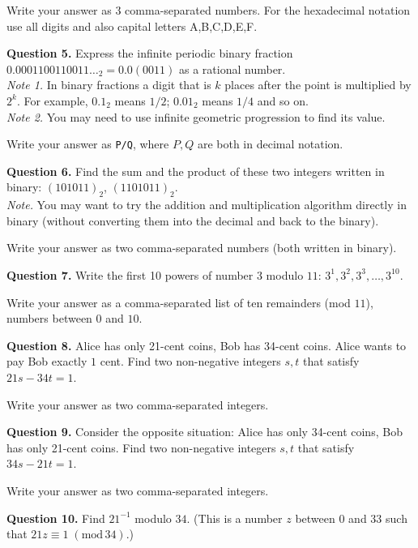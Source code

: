 \documentclass[jou]{apa6}
\begin{document}
Write your answer as $3$ comma-separated numbers. For the hexadecimal notation use all digits and also capital letters A,B,C,D,E,F.


\vspace{6pt}
{\bf Question 5.}
Express the infinite periodic binary fraction $0.0001100110011\ldots_2 = 0.0(0011)$ as a rational number.\\
{\em Note 1.} In binary fractions a digit that is $k$ places after the point is multiplied by $2^k$. 
For example, $0.1_2$ means $1/2$; $0.01_2$ means $1/4$ and so on.\\
{\em Note 2.} You may need to use infinite geometric progression to find its value.

Write your answer as {\tt P/Q}, where $P,Q$ are both in decimal notation. 


\vspace{6pt}
{\bf Question 6.} Find the sum and the product of these two integers written in binary: 
$(101011)_2$, $(1101011)_2$.\\
{\em Note.} You may want to try the addition and multiplication algorithm directly in 
binary (without converting them into the decimal and back to the binary).

Write your answer as two comma-separated numbers (both written in binary). 


\vspace{6pt}
{\bf Question 7.} Write the first 10 powers of number $3$ modulo $11$: $3^1,3^2,3^3,\ldots,3^{10}$. 

Write your answer as a comma-separated list of ten remainders (mod $11$), \textendash{} numbers between $0$ and $10$.


\vspace{6pt}
{\bf Question 8.} Alice has only 21-cent coins, 
Bob has 34-cent coins. Alice wants to pay Bob exactly $1$ cent. 
Find two non-negative integers $s,t$ that satisfy $21s - 34t = 1$. 

Write your answer as two comma-separated integers. 

\vspace{6pt}
{\bf Question 9.} Consider the opposite situation: Alice has only 34-cent coins, 
Bob has only 21-cent coins. Find two non-negative integers 
$s,t$ that satisfy $34s - 21t = 1$. 

Write your answer as two comma-separated integers. 

\vspace{6pt}
{\bf Question 10.} Find $21^{-1}$ modulo $34$. (This is a number $z$ between $0$ and $33$ such that
$21z \equiv 1\;(\text{mod}\,34)$.)
\end{document}
